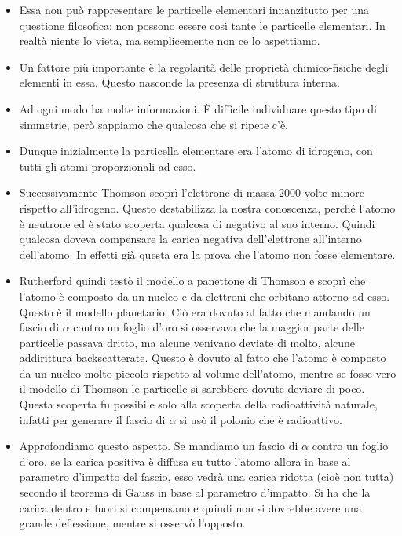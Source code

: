 \begin{itemize}
    \item Essa non può rappresentare le particelle elementari innanzitutto per una questione filosofica: non possono essere così tante le particelle elementari. In realtà niente lo vieta, ma semplicemente non ce lo aspettiamo.
    \item Un fattore più importante è la regolarità delle proprietà chimico-fisiche degli elementi in essa. Questo nasconde la presenza di struttura interna.
    \item Ad ogni modo ha molte informazioni. È difficile individuare questo tipo di simmetrie, però sappiamo che qualcosa che si ripete c'è.
    \item Dunque inizialmente la particella elementare era l'atomo di idrogeno, con tutti gli atomi proporzionali ad esso.
    \item Successivamente Thomson scoprì l'elettrone di massa 2000 volte minore rispetto all'idrogeno. Questo destabilizza la nostra conoscenza, perché l'atomo è neutrone ed è stato scoperta qualcosa di negativo al suo interno. Quindi qualcosa doveva compensare la carica negativa dell'elettrone all'interno dell'atomo. In effetti già questa era la prova che l'atomo non fosse elementare.
    \item Rutherford quindi testò il modello a panettone di Thomson e scoprì che l'atomo è composto da un nucleo e da elettroni che orbitano attorno ad esso. Questo è il modello planetario. Ciò era dovuto al fatto che mandando un fascio di $\alpha$ contro un foglio d'oro si osservava che la maggior parte delle particelle passava dritto, ma alcune venivano deviate di molto, alcune addirittura backscatterate. Questo è dovuto al fatto che l'atomo è composto da un nucleo molto piccolo rispetto al volume dell'atomo, mentre se fosse vero il modello di Thomson le particelle si sarebbero dovute deviare di poco. Questa scoperta fu possibile solo alla scoperta della radioattività naturale, infatti per generare il fascio di $\alpha$ si usò il polonio che è radioattivo.
    \item Approfondiamo questo aspetto. Se mandiamo un fascio di $\alpha$ contro un foglio d'oro, se la carica positiva è diffusa su tutto l'atomo allora in base al parametro d'impatto del fascio, esso vedrà una carica ridotta (cioè non tutta) secondo il teorema di Gauss in base al parametro d'impatto. Si ha che la carica dentro e fuori si compensano e quindi non si dovrebbe avere una grande deflessione, mentre si osservò l'opposto.
\end{itemize}
